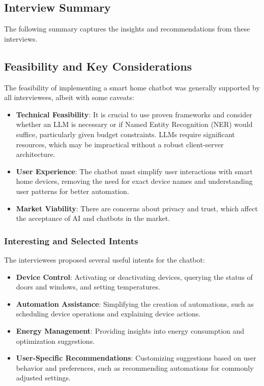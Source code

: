 \subsection{Interview Summary}
\label{sec:interview_summary}

The following summary captures the insights and recommendations from these interviews.

\subsection{Feasibility and Key Considerations}

The feasibility of implementing a smart home chatbot was generally supported by all interviewees, albeit with some caveats:

\begin{itemize}
    \item \textbf{Technical Feasibility}: It is crucial to use proven frameworks and consider whether an LLM is necessary or if Named Entity Recognition (NER) would suffice, particularly given budget constraints. LLMs require significant resources, which may be impractical without a robust client-server architecture.
    \item \textbf{User Experience}: The chatbot must simplify user interactions with smart home devices, removing the need for exact device names and understanding user patterns for better automation.
    \item \textbf{Market Viability}: There are concerns about privacy and trust, which affect the acceptance of AI and chatbots in the market.
\end{itemize}

\subsubsection{Interesting and Selected Intents}

The interviewees proposed several useful intents for the chatbot:

\begin{itemize}
    \item \textbf{Device Control}: Activating or deactivating devices, querying the status of doors and windows, and setting temperatures.
    \item \textbf{Automation Assistance}: Simplifying the creation of automations, such as scheduling device operations and explaining device actions.
    \item \textbf{Energy Management}: Providing insights into energy consumption and optimization suggestions.
    \item \textbf{User-Specific Recommendations}: Customizing suggestions based on user behavior and preferences, such as recommending automations for commonly adjusted settings.
\end{itemize}

